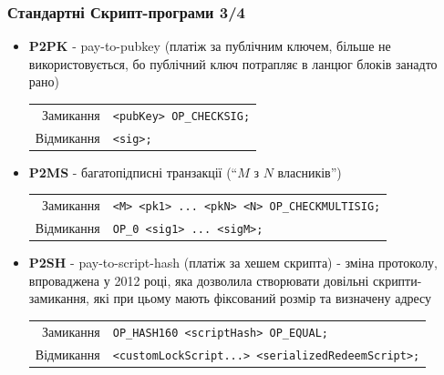 \documentclass{beamer}
\begin{document}
\begin{frame}[fragile]
  \frametitle{Стандартні Скрипт-програми 3/4}
  \begin{itemize}
  \item \textbf{P2PK} - pay-to-pubkey (платіж за публічним ключем, більше не
    використовується, бо публічний ключ потрапляє в ланцюг блоків занадто рано)
    \break
    \begin{tabular}{rl}
      Замикання &\tiny\texttt{<pubKey> OP_CHECKSIG;} \\
      Відмикання &\tiny\texttt{<sig>;} \\
    \end{tabular}
  \item \textbf{P2MS} - багатопідписні транзакції (``$M$ з $N$ власників'')
    \break
    \begin{tabular}{rl}
      Замикання &\tiny\texttt{<M> <pk1> ... <pkN> <N> OP_CHECKMULTISIG;} \\
      Відмикання &\tiny\texttt{OP_0 <sig1> ... <sigM>;} \\
    \end{tabular}
  \item \textbf{P2SH} - pay-to-script-hash (платіж за хешем скрипта) - зміна
    протоколу, впроваджена у 2012 році, яка дозволила створювати довільні
    скрипти-замикання, які при цьому мають фіксований розмір та визначену адресу
    \break
    \begin{tabular}{rl}
      Замикання &\tiny\texttt{OP_HASH160 <scriptHash> OP_EQUAL;} \\
      Відмикання &\tiny\texttt{<customLockScript...> <serializedRedeemScript>;} \\
    \end{tabular}
  \end{itemize}
\end{frame}
\end{document}
